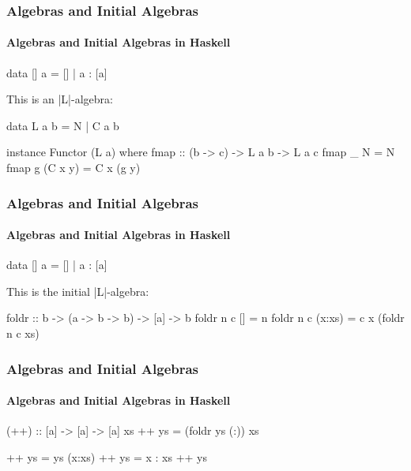 \documentclass{beamer}
\begin{document}

\begin{frame}[fragile]
  \frametitle{Algebras and Initial Algebras}
  \framesubtitle{Algebras and Initial Algebras in Haskell}

  \begin{example}
    \begin{code}
data [] a = [] | a : [a]
    \end{code}
    This is an |L|-algebra:
    \begin{code}
data L a b = N | C a b

instance Functor (L a) where
  fmap :: (b -> c) -> L a b -> L a c
  fmap _ N       = N
  fmap g (C x y) = C x (g y)
    \end{code}
  \end{example}

\end{frame}


\begin{frame}[fragile]
  \frametitle{Algebras and Initial Algebras}
  \framesubtitle{Algebras and Initial Algebras in Haskell}

  \begin{example}
    \begin{code}
data [] a = [] | a : [a]
    \end{code}
    This is the initial |L|-algebra:
    \begin{code}
foldr :: b -> (a -> b -> b) -> [a] -> b
foldr n c []     = n
foldr n c (x:xs) = c x (foldr n c xs)
    \end{code}
  \end{example}

\end{frame}


\begin{frame}[fragile]
  \frametitle{Algebras and Initial Algebras}
  \framesubtitle{Algebras and Initial Algebras in Haskell}

  \begin{example}
    \begin{code}
(++) :: [a] -> [a] -> [a]
xs ++ ys = (foldr ys (:)) xs
    \end{code}
    \begin{code}
[]     ++ ys = ys
(x:xs) ++ ys = x : xs ++ ys
    \end{code}
  \end{example}

\end{frame}

\end{document}
